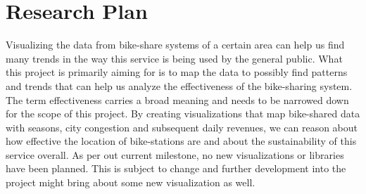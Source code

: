\section{Research Plan} 
\label{sec:research}

Visualizing the data from bike-share systems of a certain area can help us find many trends in the way this service is being used by the general public. What this project is primarily aiming for is to map the data to possibly find patterns and trends that can help us analyze the effectiveness of the bike-sharing system. The term effectiveness carries a broad meaning and needs to be narrowed down for the scope of this project. By creating visualizations that map bike-shared data with seasons, city congestion and subsequent daily revenues, we can reason about how effective the location of bike-stations are and about the sustainability of this service overall. As per out current milestone, no new visualizations or libraries have been planned. This is subject to change and further development into the project might bring about some new visualization as well. 

